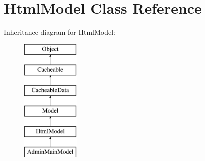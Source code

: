\hypertarget{class_html_model}{\section{Html\-Model Class Reference}
\label{class_html_model}
}
Inheritance diagram for Html\-Model\-:\begin{figure}[H]
\begin{center}
\leavevmode
\includegraphics[height=6.000000cm]{class_html_model}
\end{center}
\end{figure}
